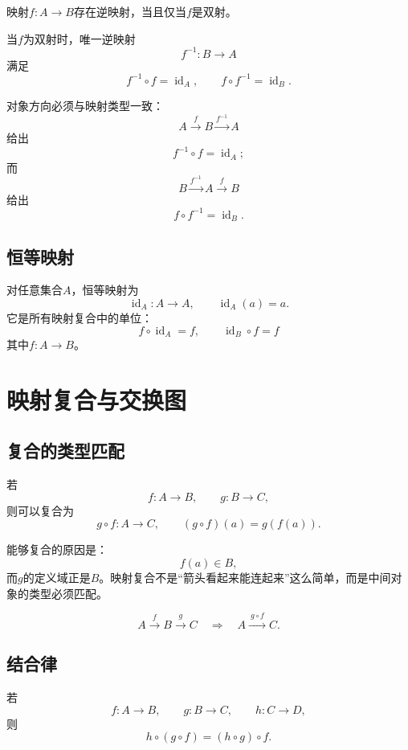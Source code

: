 \begin{theorem}[逆映射判定]
映射$f:A\to B$存在逆映射，当且仅当$f$是双射。
\end{theorem}

当$f$为双射时，唯一逆映射
\[
    f^{-1}:B\to A
\]
满足
\[
    f^{-1}\circ f=\operatorname{id}_A,
    \qquad
    f\circ f^{-1}=\operatorname{id}_B.
\]

对象方向必须与映射类型一致：
\[
    A\xrightarrow{f}B\xrightarrow{f^{-1}}A
\]
给出
\[
    f^{-1}\circ f=\operatorname{id}_A;
\]
而
\[
    B\xrightarrow{f^{-1}}A\xrightarrow{f}B
\]
给出
\[
    f\circ f^{-1}=\operatorname{id}_B.
\]

\subsection{恒等映射}

对任意集合$A$，恒等映射为
\[
    \operatorname{id}_A:A\to A,
    \qquad
    \operatorname{id}_A(a)=a.
\]
它是所有映射复合中的单位：
\[
    f\circ\operatorname{id}_A=f,
    \qquad
    \operatorname{id}_B\circ f=f
\]
其中$f:A\to B$。


\section{映射复合与交换图}

\subsection{复合的类型匹配}

若
\[
    f:A\to B,\qquad g:B\to C,
\]
则可以复合为
\[
    g\circ f:A\to C,
    \qquad
    (g\circ f)(a)=g(f(a)).
\]

能够复合的原因是：
\[
    f(a)\in B,
\]
而$g$的定义域正是$B$。映射复合不是“箭头看起来能连起来”这么简单，而是中间对象的类型必须匹配。

\[
    A\xrightarrow{\ f\ }B\xrightarrow{\ g\ }C
    \quad\Longrightarrow\quad
    A\xrightarrow{\ g\circ f\ }C.
\]

\subsection{结合律}

\begin{theorem}[映射复合结合律]
若
\[
    f:A\to B,\qquad
    g:B\to C,\qquad
    h:C\to D,
\]
则
\[
    h\circ(g\circ f)
    =
    (h\circ g)\circ f.
\]
\end{theorem}

